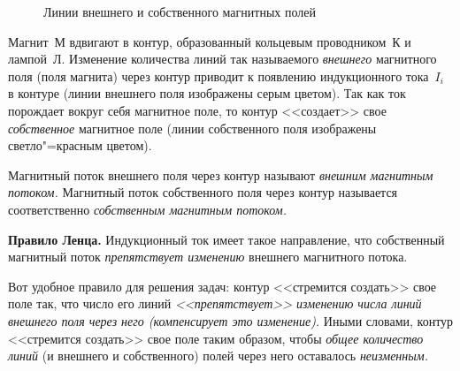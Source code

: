 \documentclass[main.tex]{subfiles}
\begin{document}
\begin{NoHyper}
\begin{figure}[H]
\caption{Линии внешнего и собственного магнитных полей}
\label{fig:p163}
\end{figure}


Магнит~М вдвигают в контур, образованный кольцевым проводником~К и лампой~Л. Изменение количества линий так называемого \emph{внешнего} магнитного поля (поля магнита) через контур приводит к появлению индукционного тока~$I_i$ в контуре (линии внешнего поля изображены серым цветом). Так как ток порождает вокруг себя магнитное поле, то контур <<создает>> свое \emph{собственное} магнитное поле (линии собственного поля изображены светло"=красным цветом). 

Магнитный поток внешнего поля через контур называют \emph{внешним магнитным потоком.} Магнитный поток собственного поля через контур называется соответственно \emph{собственным магнитным потоком.} %
\begin{law}
    \textbf{Правило Ленца.} Индукционный ток имеет такое направление, что собственный магнитный поток \emph{препятствует изменению} внешнего магнитного потока.
\end{law}

Вот удобное правило для решения задач: контур <<стремится создать>> свое поле так, что число его линий \emph{<<препятствует>> изменению числа линий внешнего поля через него (компенсирует это изменение).} Иными словами, контур <<стремится создать>> свое поле таким образом, чтобы \emph{общее количество линий} (и внешнего и собственного) полей через него оставалось \emph{неизменным.}


\end{NoHyper}
\end{document}
